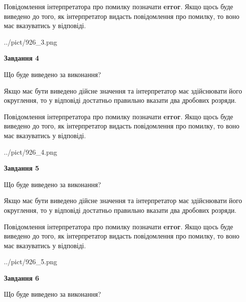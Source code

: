 \documentclass[12pt, ukrainian]{article}
\begin{document}
{\begin {Large}
Повідомлення інтерпретатора про помилку позначати \textbf{error}.
Якщо щось буде виведено до того, як інтерпретатор видасть повідомлення про помилку, 
то воно має вказуватись у відповіді. \par

\begin{center}
	{../pict/926_3.png}
\end{center}
\newpage

{\begin {center}\textbf{Завдання 4}\end {center}}\par
Що буде виведено за виконання? \par

Якщо має бути виведено дійсне значення та інтерпретатор має здійснювати його округлення, 
то у відповіді достатньо правильно вказати два дробових розряди.

Повідомлення інтерпретатора про помилку позначати \textbf{error}.
Якщо щось буде виведено до того, як інтерпретатор видасть повідомлення про помилку, 
то воно має вказуватись у відповіді. \par

\begin{center}
	{../pict/926_4.png}
\end{center}
\newpage

{\begin {center}\textbf{Завдання 5}\end {center}}\par
Що буде виведено за виконання? \par

Якщо має бути виведено дійсне значення та інтерпретатор має здійснювати його округлення, 
то у відповіді достатньо правильно вказати два дробових розряди.

Повідомлення інтерпретатора про помилку позначати \textbf{error}.
Якщо щось буде виведено до того, як інтерпретатор видасть повідомлення про помилку, 
то воно має вказуватись у відповіді. \par

\begin{center}
	{../pict/926_5.png}
\end{center}
\newpage

{\begin {center}\textbf{Завдання 6}\end {center}}\par
Що буде виведено за виконання? \par


\end{Large}}
\end{document}
